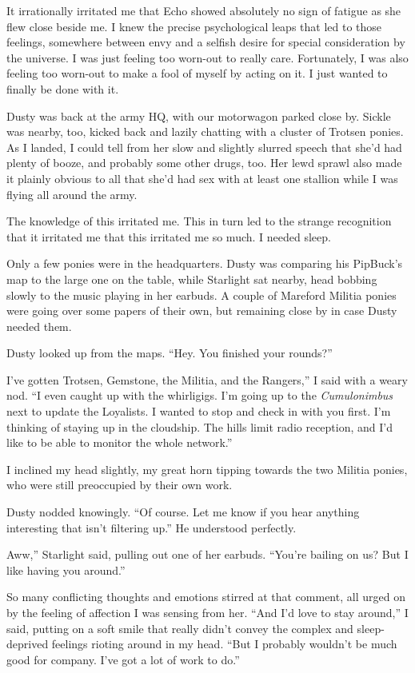 It irrationally irritated me that Echo showed absolutely no sign of fatigue as she flew close beside me. I knew the precise psychological leaps that led to those feelings, somewhere between envy and a selfish desire for special consideration by the universe. I was just feeling too worn-out to really care. Fortunately, I was also feeling too worn-out to make a fool of myself by acting on it. I just wanted to finally be done with it.

Dusty was back at the army HQ, with our motorwagon parked close by. Sickle was nearby, too, kicked back and lazily chatting with a cluster of Trotsen ponies. As I landed, I could tell from her slow and slightly slurred speech that she’d had plenty of booze, and probably some other drugs, too. Her lewd sprawl also made it plainly obvious to all that she’d had sex with at least one stallion while I was flying all around the army.

The knowledge of this irritated me. This in turn led to the strange recognition that it irritated me that this irritated me so much. I needed sleep.

Only a few ponies were in the headquarters. Dusty was comparing his PipBuck’s map to the large one on the table, while Starlight sat nearby, head bobbing slowly to the music playing in her earbuds. A couple of Mareford Militia ponies were going over some papers of their own, but remaining close by in case Dusty needed them.

Dusty looked up from the maps. “Hey. You finished your rounds?”

\leavevmode{}I’ve gotten Trotsen, Gemstone, the Militia, and the Rangers,” I said with a weary nod. “I even caught up with the whirligigs. I’m going up to the \textit{Cumulonimbus} next to update the Loyalists. I wanted to stop and check in with you first. I’m thinking of staying up in the cloudship. The hills limit radio reception, and I’d like to be able to monitor the whole network.”

I inclined my head slightly, my great horn tipping towards the two Militia ponies, who were still preoccupied by their own work.

Dusty nodded knowingly. “Of course. Let me know if you hear anything interesting that isn’t filtering up.” He understood perfectly.

\leavevmode{}Aww,” Starlight said, pulling out one of her earbuds. “You’re bailing on us? But I like having you around.”

So many conflicting thoughts and emotions stirred at that comment, all urged on by the feeling of affection I was sensing from her. “And I’d love to stay around,” I said, putting on a soft smile that really didn’t convey the complex and sleep-deprived feelings rioting around in my head. “But I probably wouldn’t be much good for company. I’ve got a lot of work to do.”


